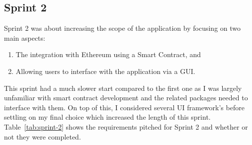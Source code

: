 \subsection*{Sprint 2}

Sprint 2 was about increasing the scope of the application by focusing on two main aspects:

\begin{enumerate}
  \item The integration with Ethereum using a Smart Contract, and
  \item Allowing users to interface with the application via a GUI.
\end{enumerate}

\newparagraph
This sprint had a much slower start compared to the first one as I was largely unfamiliar with smart contract development and the related packages needed to interface with them. On top of this, I considered several UI framework's before settling on my final choice which increased the length of this sprint.
\x
Table~\ref{tab:sprint-2} shows the requirements pitched for Sprint 2 and whether or not they were completed.

